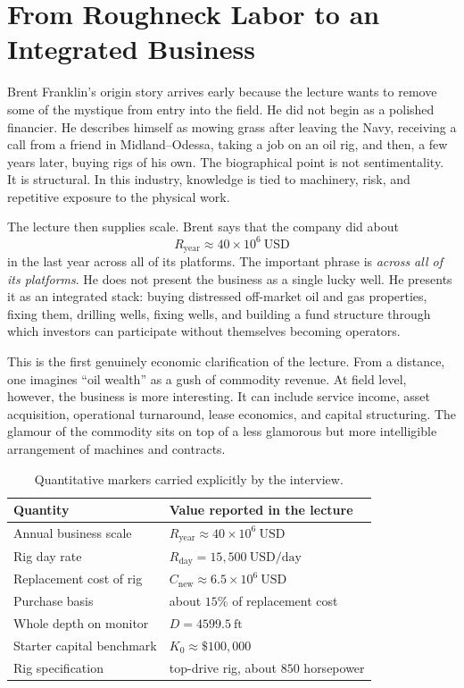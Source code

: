 \section{From Roughneck Labor to an Integrated Business}

Brent Franklin's origin story arrives early because the lecture wants to remove some of the mystique from entry into the field. He did not begin as a polished financier. He describes himself as mowing grass after leaving the Navy, receiving a call from a friend in Midland--Odessa, taking a job on an oil rig, and then, a few years later, buying rigs of his own. The biographical point is not sentimentality. It is structural. In this industry, knowledge is tied to machinery, risk, and repetitive exposure to the physical work.

The lecture then supplies scale. Brent says that the company did about
\begin{equation}
R_{\mathrm{year}} \approx 40 \times 10^6\ \mathrm{USD}
\end{equation}
in the last year across all of its platforms. The important phrase is \emph{across all of its platforms}. He does not present the business as a single lucky well. He presents it as an integrated stack: buying distressed off-market oil and gas properties, fixing them, drilling wells, fixing wells, and building a fund structure through which investors can participate without themselves becoming operators.

This is the first genuinely economic clarification of the lecture. From a distance, one imagines ``oil wealth'' as a gush of commodity revenue. At field level, however, the business is more interesting. It can include service income, asset acquisition, operational turnaround, lease economics, and capital structuring. The glamour of the commodity sits on top of a less glamorous but more intelligible arrangement of machines and contracts.

\begin{table}[h]
\centering
\begin{tabular}{|l|l|}
\hline
Quantity & Value reported in the lecture \\
\hline
Annual business scale & \(R_{\mathrm{year}} \approx 40 \times 10^6\ \mathrm{USD}\) \\
Rig day rate & \(R_{\mathrm{day}} = 15{,}500\ \mathrm{USD/day}\) \\
Replacement cost of rig & \(C_{\mathrm{new}} \approx 6.5 \times 10^6\ \mathrm{USD}\) \\
Purchase basis & about \(15\%\) of replacement cost \\
Whole depth on monitor & \(D = 4599.5\ \mathrm{ft}\) \\
Starter capital benchmark & \(K_0 \approx \$100{,}000\) \\
Rig specification & top-drive rig, about \(850\) horsepower \\
\hline
\end{tabular}
\caption{Quantitative markers carried explicitly by the interview.}
\end{table}

